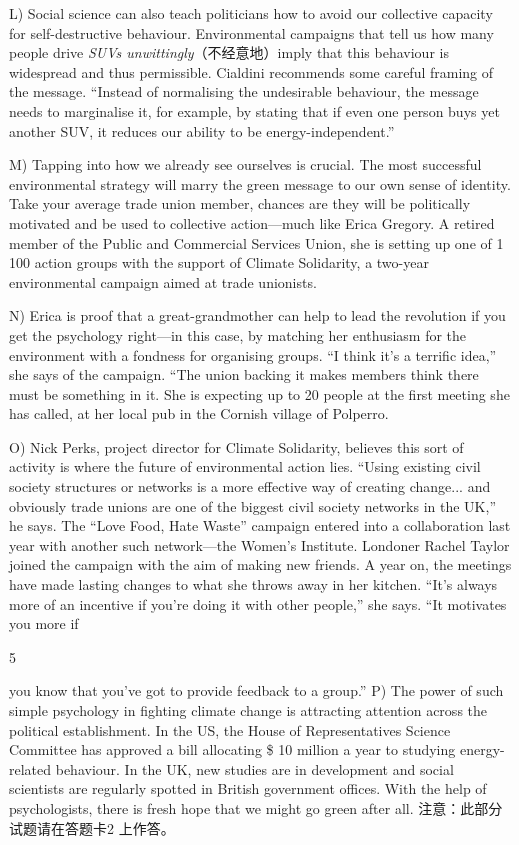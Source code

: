 \documentclass[UTF8,11pt]{ctexart}
\begin{document}
L) Social science can also teach politicians how to avoid our collective capacity for self-destructive behaviour. Environmental campaigns that tell us how many people drive\textit{ SUVs unwittingly}（不经意地）imply that this behaviour is widespread and thus permissible. Cialdini recommends some careful framing of the message. “Instead of normalising the undesirable behaviour, the message needs to marginalise it, for example, by stating that if even one person buys yet another SUV, it reduces our ability to be energy-independent.”


M) Tapping into how we already see ourselves is crucial. The most successful environmental strategy will marry the green message to our own sense of identity. Take your average trade union member, chances are they will be politically motivated and be used to collective action—much like Erica Gregory. A retired member of the Public and Commercial Services Union, she is setting up one of 1 100 action groups with the support of Climate Solidarity, a two-year environmental campaign aimed at trade unionists.


N) Erica is proof that a great-grandmother can help to lead the revolution if you get the psychology right—in this case, by matching her enthusiasm for the environment with a fondness for organising groups. “I think it’s a terrific idea,” she says of the campaign. “The union backing it makes members think there must be something in it. She is expecting up to 20 people at the first meeting she has called, at her local pub in the Cornish village of Polperro.


O) Nick Perks, project director for Climate Solidarity, believes this sort of activity is where the future of environmental action lies. “Using existing civil society structures or networks is a more effective way of creating change... and obviously trade unions are one of the biggest civil society networks in the UK,” he says. The “Love Food, Hate Waste” campaign entered into a collaboration last year with another such network—the Women’s Institute. Londoner Rachel Taylor joined the campaign with the aim of making new friends. A year on, the meetings have made lasting changes to what she throws away in her kitchen. “It’s always more of an incentive if you’re doing it with other people,” she says. “It motivates you more if


5


you know that you’ve got to provide feedback to a group.” P) The power of such simple psychology in fighting climate change is attracting attention across the political establishment. In the US, the House of Representatives Science Committee has approved a bill allocating \$ 10 million a year to studying energy-related behaviour. In the UK, new studies are in development and social scientists are regularly spotted in British government offices. With the help of psychologists, there is fresh hope that we might go green after all. 注意：此部分试题请在答题卡2 上作答。
\end{document}
